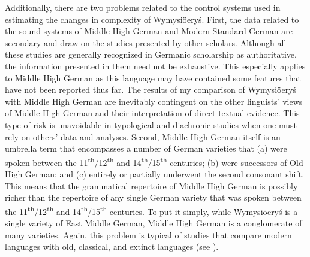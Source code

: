 \documentclass[output=paper,hidelinks]{langscibook}
\begin{document}
Additionally, there are two problems related to the control systems used in estimating the changes in complexity of Wymysiöeryś. First, the data related to the sound systems of Middle High German and Modern Standard German are secondary and draw on the studies presented by other scholars. Although all these studies are generally recognized in Germanic scholarship as authoritative, the information presented in them need not be exhaustive. This especially applies to Middle High German as this language may have contained some features that have not been reported thus far. The results of my comparison of Wymysiöeryś with Middle High German are inevitably contingent on the other linguists' views of Middle High German and their interpretation of direct textual evidence. This type of risk is unavoidable in typological and diachronic studies when one must rely on others' data and analyses. Second, Middle High German itself is an umbrella term that encompasses a number of German varieties that (a) were spoken between the 11\textsuperscript{th}/12\textsuperscript{th} and 14\textsuperscript{th}/15\textsuperscript{th} centuries; (b) were successors of Old High German; and (c) entirely or partially underwent the second consonant shift. This means that the grammatical repertoire of Middle High German is possibly richer than the repertoire of any single German variety that was spoken between the 11\textsuperscript{th}/12\textsuperscript{th} and 14\textsuperscript{th}/15\textsuperscript{th} centuries. To put it simply, while Wymysiöeryś is a single variety of East Middle German, Middle High German is a conglomerate of many varieties. Again, this problem is typical of studies that compare modern languages with old, classical, and extinct languages (see \citealt{Andrasonforthcoming}).
\end{document}
